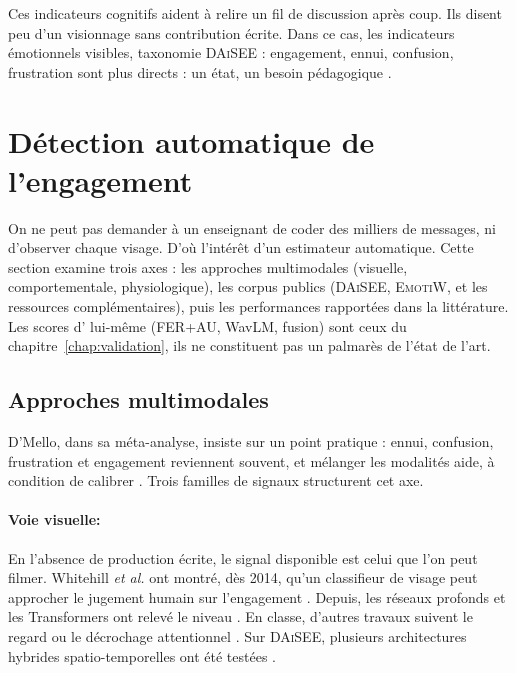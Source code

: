 Ces indicateurs cognitifs aident à relire un fil de discussion
après coup. Ils disent peu d'un visionnage sans contribution
écrite. Dans ce cas, les indicateurs émotionnels visibles, taxonomie
\textsc{DAiSEE} : engagement, ennui, confusion, frustration sont plus
directs : un état, un besoin pédagogique \cite{gupta2016daisee}.

\section{Détection automatique de l'engagement}
\label{sec:ea-detection}

On ne peut pas demander à un enseignant de coder des milliers de messages,
ni d'observer chaque visage. D'où l'intérêt d'un estimateur automatique.
Cette section examine trois axes : les approches multimodales (visuelle,
comportementale, physiologique), les corpus publics (\textsc{DAiSEE},
\textsc{EmotiW}, et les ressources complémentaires), puis les performances
rapportées dans la littérature. Les scores d'\emolearn{} lui-même (FER+AU,
WavLM, fusion) sont ceux du chapitre~\ref{chap:validation}, ils ne
constituent pas un palmarès de l'état de l'art.

\subsection{Approches multimodales}
\label{sec:ea-detection-multimodal}

D'Mello, dans sa méta-analyse, insiste sur un point pratique : ennui,
confusion, frustration et engagement reviennent souvent, et mélanger les
modalités aide, à condition de calibrer \cite{dmello2015review}. Trois
familles de signaux structurent cet axe.

\paragraph{Voie visuelle:}
En l'absence de production écrite, le signal disponible est celui que
l'on peut filmer. Whitehill \emph{et al.} ont montré, dès 2014, qu'un
classifieur de visage
peut approcher le jugement humain sur l'engagement
\cite{whitehill2014faces}. Depuis, les réseaux profonds et les Transformers
ont relevé le niveau \cite{li2020deepfer,dosovitskiy2021vit}. En classe,
d'autres travaux suivent le regard ou le décrochage attentionnel
\cite{goldberg2021attentive,hutt2021automated}. Sur \textsc{DAiSEE},
plusieurs architectures hybrides spatio-temporelles ont été testées
\cite{abedi2021improving,gupta2023multimodal}.


